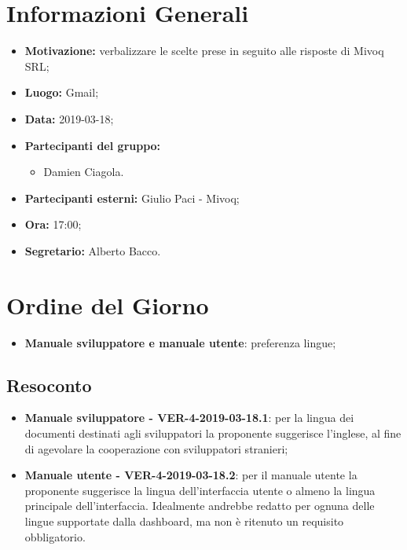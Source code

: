 \documentclass[a4paper, oneside, openany, dvipsnames, table]{article}
\begin{document}
\copertina{}


\newpage
\tableofcontents
\newpage
\section{Informazioni Generali}
\begin{itemize}
\item \textbf{Motivazione:} verbalizzare le scelte prese in seguito alle risposte di Mivoq SRL;
\item \textbf{Luogo:} Gmail;
\item \textbf{Data:} 2019-03-18;
\item \textbf{Partecipanti del gruppo:} \hfill
	\begin{itemize}
	\item Damien Ciagola.
	\end{itemize} 
\item \textbf{Partecipanti esterni:} Giulio Paci - Mivoq;
\item \textbf{Ora:} 17:00;
\item \textbf{Segretario:} Alberto Bacco.
\end{itemize}

\section{Ordine del Giorno}
\begin{itemize}
	\item \textbf{Manuale sviluppatore e manuale utente}: preferenza lingue;
\end{itemize}

\subsection{Resoconto}
\begin{itemize}
	\item \textbf{Manuale sviluppatore - VER-4-2019-03-18.1}: 
	per la lingua dei documenti destinati agli sviluppatori 
	la proponente suggerisce l'inglese, al fine di agevolare la cooperazione 
	con sviluppatori stranieri;
	\item \textbf{Manuale utente - VER-4-2019-03-18.2}:
	per il manuale utente la proponente suggerisce la lingua dell'interfaccia 
	utente o almeno la lingua principale dell'interfaccia.
	Idealmente andrebbe redatto per ognuna delle lingue supportate 
	dalla dashboard, ma non è ritenuto un requisito obbligatorio.
	
	
\end{itemize}
\end{document}
